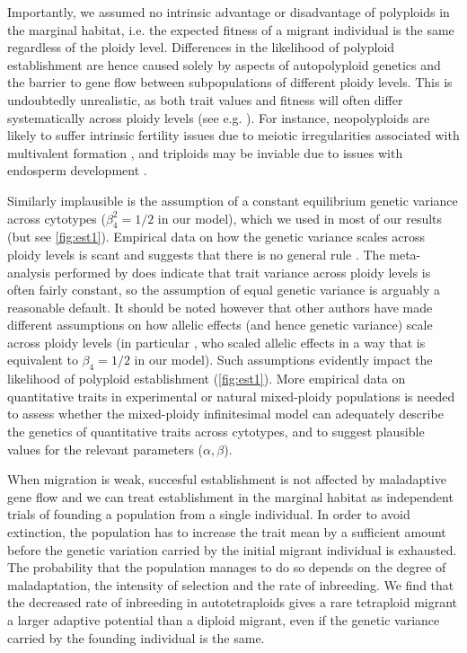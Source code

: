 \documentclass[12pt,a4paper]{article}
\begin{document}
Importantly, we assumed no intrinsic advantage or disadvantage of polyploids in
the marginal habitat, i.e. the expected fitness of a migrant individual is the
same regardless of the ploidy level.
Differences in the likelihood of polyploid establishment are hence caused
solely by aspects of autopolyploid genetics and the barrier to gene flow
between subpopulations of different ploidy levels.
This is undoubtedly unrealistic, as both trait values and fitness will often
differ systematically across ploidy levels (see e.g. \cite{porturas2019}).
For instance, neopolyploids are likely to suffer intrinsic fertility issues due
to meiotic irregularities associated with multivalent formation
\citep{bomblies2016,novikova2023}, and triploids may be inviable due to
issues with endosperm development \citep{bretagnolle1995}.

Similarly implausible is the assumption of a constant equilibrium genetic
variance across cytotypes ($\beta_4^2=1/2$ in our model), which we used in
most of our results (but see \cref{fig:est1}).
Empirical data on how the genetic variance scales across ploidy levels is scant
and suggests that there is no general rule \citep{gallais2003,porturas2019}.
The meta-analysis performed by \cite{porturas2019} does indicate that trait
variance across ploidy levels is often fairly constant, so the assumption of
equal genetic variance is arguably a reasonable default.
It should be noted however that other authors have made different assumptions
on how allelic effects (and hence genetic variance) scale across ploidy levels
(in particular \cite{griswold2021}, who scaled allelic effects in a way that is
equivalent to $\beta_4 = 1/2$ in our model).
Such assumptions evidently impact the likelihood of polyploid establishment 
(\cref{fig:est1}).
More empirical data on quantitative traits in experimental or natural
mixed-ploidy populations is needed to assess whether the mixed-ploidy
infinitesimal model can adequately describe the genetics of quantitative traits
across cytotypes, and to suggest plausible values for the relevant parameters
($\alpha, \beta$).

When migration is weak, succesful establishment is not affected by
maladaptive gene flow and we can treat establishment in the marginal habitat as
independent trials of founding a population from a single individual.
In order to avoid extinction, the population has to increase the trait mean
by a sufficient amount before the genetic variation carried by the initial
migrant individual is exhausted.
The probability that the population manages to do so depends on the degree of
maladaptation, the intensity of selection and the rate of inbreeding.
We find that the decreased rate of inbreeding in autotetraploids gives a
rare tetraploid migrant a larger adaptive potential than a diploid migrant,
even if the genetic variance carried by the founding individual is the same.
\end{document}
